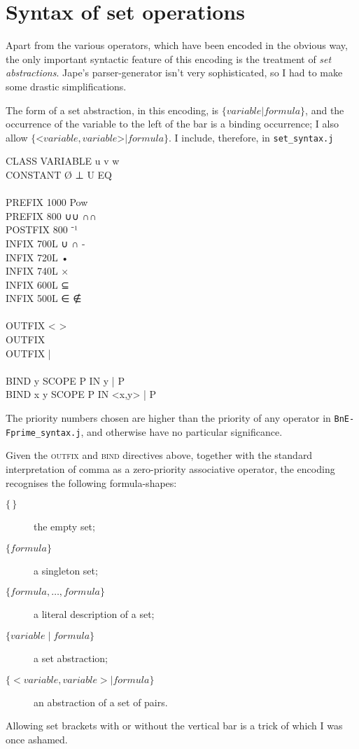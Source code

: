 \section{Syntax of set operations}

Apart from the various operators, which have been encoded in the obvious way, the only important syntactic feature of this encoding is the treatment of \emph{set abstractions}. Jape's parser-generator isn't very sophisticated, so I had to make some drastic simplifications.

The form of a set abstraction, in this encoding, is $\{ \mathit{variable} | \mathit{formula} \}$, and the occurrence of the variable to the left of the bar is a binding occurrence; I also allow $\{ \texttt{<}\mathit{variable},\mathit{variable}\texttt{>} | \mathit{formula} \}$. I include, therefore, in \texttt{set\_syntax.j}
\begin{japeish}
CLASS VARIABLE u v w \\
CONSTANT Ø ⊥ U EQ \\
\\
PREFIX  1000            Pow \\
PREFIX  800             ∪∪ ∩∩ \\
POSTFIX 800             ⁻¹ \\
INFIX           700L            ∪ ∩ - \\
INFIX           720L            • \\
INFIX           740L            × \\
INFIX           600L            ⊆ \\
INFIX           500L            ∈ ∉ \\
\\
OUTFIX < > \\
OUTFIX { } \\
OUTFIX { | } \\
 \\
BIND y SCOPE P IN { y | P } \\
BIND x y SCOPE P IN { <x,y> | P }
\end{japeish}
The priority numbers chosen are higher than the priority of any operator in \texttt{BnE-Fprime\_syntax.j}, and otherwise have no particular significance. 

Given the \textsc{outfix} and \textsc{bind} directives above, together with the standard interpretation of comma as a zero-priority associative operator, the encoding recognises the following formula-shapes:
\begin{description}
\item[$\{\,\}$] the empty set;
\item[$\{ \mathit{formula} \}$] a singleton set;
\item[$\{ \mathit{formula},\dots,\mathit{formula} \}$] a literal description of a set;
\item[$\{ \mathit{variable} \mid \mathit{formula} \}$] a set abstraction;
\item[$\{ <\!\mathit{variable}, \mathit{variable}\!> \mid \mathit{formula} \}$] an abstraction of a set of pairs.
\end{description}
Allowing set brackets with or without the vertical bar is a trick of which I was once ashamed.

